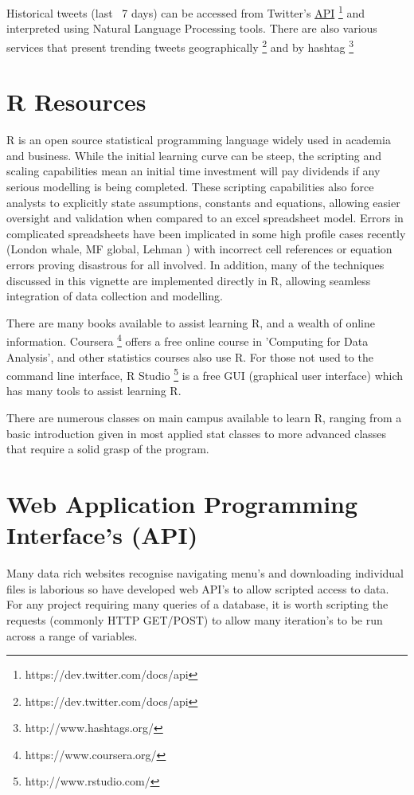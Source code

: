 \documentclass[11pt]{article}
\begin{document}
	Historical tweets (last ~7 days) can be accessed from Twitter's \hyperref[api]{API} \footnote{https://dev.twitter.com/docs/api} and interpreted using Natural Language Processing tools.
	There are also various services that present trending tweets geographically \footnote{https://dev.twitter.com/docs/api}  and by hashtag \footnote{http://www.hashtags.org/}


\newpage

\appendix
\appendixpage
\addappheadtotoc
	
\section{R Resources} \label{app:mod}
	R is an open source statistical programming language widely used in academia and business.
	While the initial learning curve can be steep, the scripting and scaling capabilities mean an initial time investment will pay dividends if any serious modelling is being completed.
	These scripting capabilities also force analysts to explicitly state assumptions, constants and equations, allowing easier oversight and validation when compared to an excel spreadsheet model.
	Errors in complicated spreadsheets have been implicated in some high profile cases recently (London whale, MF global, Lehman \cite{excel13}) with incorrect cell references or equation errors proving disastrous for all involved. 
	In addition, many of the techniques discussed in this vignette are implemented directly in R, allowing seamless integration of data collection and modelling.


	There are many books available to assist learning R, and a wealth of online information.
	Coursera \footnote{https://www.coursera.org/} offers a free online course in 'Computing for Data Analysis', and other statistics courses also use R.
	For those not used to the command line interface, R Studio \footnote{http://www.rstudio.com/} is a free GUI (graphical user interface) which has many tools to assist learning R.

	There are numerous classes on main campus available to learn R, ranging from a basic introduction given in most applied stat classes to more advanced classes that require a solid grasp of the program.

	\section{Web Application Programming Interface's (API)}\label{api}
	Many data rich websites recognise navigating menu's and downloading individual files is laborious so have developed web API's to allow scripted access to data.
	For any project requiring many queries of a database, it is worth scripting the requests (commonly HTTP GET/POST) to allow many iteration's to be run across a range of variables.
\end{document}
